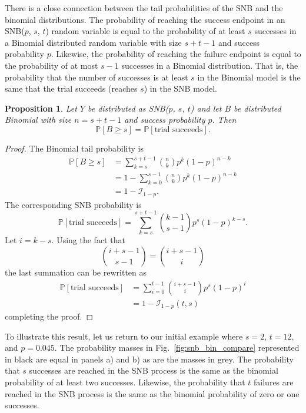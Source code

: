 \documentclass[review]{elsarticle}
\newtheorem{prop}{Proposition}
\begin{document}
There is a close connection between the tail probabilities of the SNB and the 
binomial distributions.
The probability of reaching the success endpoint in an 
SNB($p$, $s$, $t$) random variable is 
equal to the probability of at least $s$ successes in a Binomial distributed 
random variable with size $s+t-1$ and success probability $p$. 
Likewise, the probability of reaching the failure endpoint is equal
to the probability of at most $s-1$ successes in a Binomial distribution. 
That is, the probability that the number of successes is at least $s$ in the 
Binomial model is the same that the trial succeeds (reaches $s$) in the SNB 
model.
\begin{prop} \label{binomial_tail}
Let $Y$ be distributed as SNB($p$, $s$, $t$) and let 
$B$ be distributed Binomial with size $n=s+t-1$ and success probability
$p$. Then
\begin{equation}
\mathbb{P}[B \geq s] = \mathbb{P} [\text{trial succeeds}].
\end{equation}
\end{prop}
\begin{proof}
The Binomial tail probability is
\begin{align*}
\mathbb{P}[B \geq s] &= \sum_{k=s}^{s+t-1} {n \choose k} p^k (1-p)^{n-k} \\
  &= 1 - \sum_{k=0}^{s-1} {n \choose k} p^k (1-p)^{n-k} \\
  &= 1 - \mathcal{I}_{1-p}.
\end{align*}
The corresponding SNB probability is
\begin{equation*}
\mathbb{P} [\text{trial succeeds}] 
  = \sum_{k=s}^{s+t-1} {k-1 \choose s-1} p^s (1-p)^{k-s}.
\end{equation*}
Let $i=k-s$. Using the fact that
\begin{equation*}
{i+s-1 \choose s-1} = {i+s-1 \choose i}
\end{equation*}
the last summation can be rewritten as
\begin{align}
\mathbb{P} [\text{trial succeeds}] &= \sum_{i=0}^{t-1} 
  {i+s-1 \choose i} p^s (1-p)^i\\
  &= 1 - \mathcal{I}_{1-p}(t, s)
\end{align}
completing the proof.
\end{proof}

To illustrate this result, let us return to our initial example
where $s=2$, $t=12$, and $p=0.045$.  The probability masses in
Fig.~\ref{fig:snb_bin_compare} represented in 
black are equal in panels a) and b) as are the masses in grey.
The probability that $s$
successes are reached in the SNB process is the same as the binomial 
probability of at least two successes. Likewise, the probability that $t$ 
failures are reached in the SNB process is the same as the binomial
probability of zero or one successes.
\end{document}
